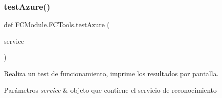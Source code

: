 \subsubsection{\texorpdfstring{test\+Azure()}{testAzure()}}
{\footnotesize\ttfamily def F\+C\+Module.\+F\+C\+Tools.\+test\+Azure (\begin{DoxyParamCaption}\item[{}]{service }\end{DoxyParamCaption})}



Realiza un test de funcionamiento, imprime los resultados por pantalla. 


\begin{DoxyParams}{Parámetros}
{\em service} & objeto que contiene el servicio de reconocimiento \\
\hline
\end{DoxyParams}
